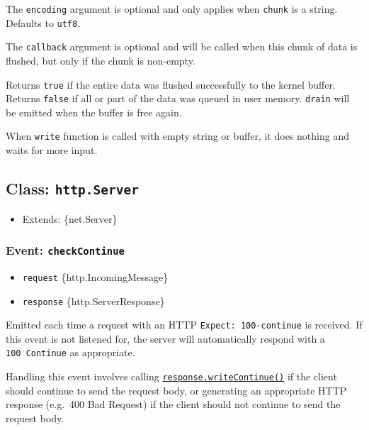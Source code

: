 The \texttt{encoding} argument is optional and only applies when
\texttt{chunk} is a string. Defaults to
\texttt{\textquotesingle{}utf8\textquotesingle{}}.

The \texttt{callback} argument is optional and will be called when this
chunk of data is flushed, but only if the chunk is non-empty.

Returns \texttt{true} if the entire data was flushed successfully to the
kernel buffer. Returns \texttt{false} if all or part of the data was
queued in user memory.
\texttt{\textquotesingle{}drain\textquotesingle{}} will be emitted when
the buffer is free again.

When \texttt{write} function is called with empty string or buffer, it
does nothing and waits for more input.

\subsection{\texorpdfstring{Class:
\texttt{http.Server}}{Class: http.Server}}\label{class-http.server}

\begin{itemize}
\tightlist
\item
  Extends: \{net.Server\}
\end{itemize}

\subsubsection{\texorpdfstring{Event:
\texttt{\textquotesingle{}checkContinue\textquotesingle{}}}{Event: \textquotesingle checkContinue\textquotesingle{}}}\label{event-checkcontinue}

\begin{itemize}
\tightlist
\item
  \texttt{request} \{http.IncomingMessage\}
\item
  \texttt{response} \{http.ServerResponse\}
\end{itemize}

Emitted each time a request with an HTTP \texttt{Expect:\ 100-continue}
is received. If this event is not listened for, the server will
automatically respond with a \texttt{100\ Continue} as appropriate.

Handling this event involves calling
\hyperref[responsewritecontinue]{\texttt{response.writeContinue()}} if
the client should continue to send the request body, or generating an
appropriate HTTP response (e.g.~400 Bad Request) if the client should
not continue to send the request body.

